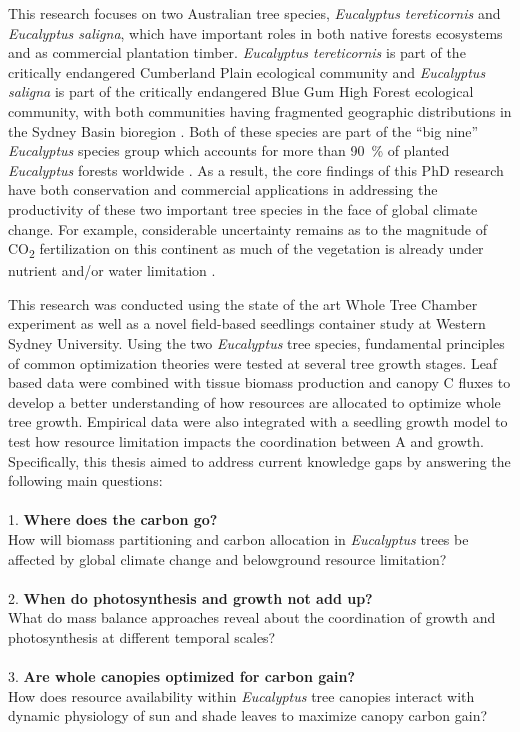 \documentclass[a4paper]{article}\usepackage[]{graphicx}\usepackage[]{color}
\begin{document}
This research focuses on two Australian tree species, \textit{Eucalyptus tereticornis} and \textit{Eucalyptus saligna}, which have important roles in both native forests ecosystems and as commercial plantation timber. \textit{Eucalyptus tereticornis} is part of the critically endangered Cumberland Plain ecological community and \textit{Eucalyptus saligna} is part of the critically endangered Blue Gum High Forest ecological community, with both communities having fragmented geographic distributions in the Sydney Basin bioregion \citep{hughes2011web}. Both of these species are part of the “big nine” \textit{Eucalyptus} species group which accounts for more than 90~\% of planted \textit{Eucalyptus} forests worldwide \citep{stanturf2013eucalyptus}. As a result, the core findings of this PhD research have both conservation and commercial applications in addressing the productivity of these two important tree species in the face of global climate change. For example, considerable uncertainty remains as to the magnitude of CO\textsubscript{2} fertilization on this continent as much of the vegetation is already under nutrient and/or water limitation \citep{hughes2003climate}. 

This research was conducted using the state of the art Whole Tree Chamber experiment as well as a novel field-based seedlings container study at Western Sydney University. Using the two \textit{Eucalyptus} tree species, fundamental principles of common optimization theories were tested at several tree growth stages. Leaf based data were combined with tissue biomass production and canopy C fluxes to develop a better understanding of how resources are allocated to optimize whole tree growth. Empirical data were also integrated with a seedling growth model to test how resource limitation impacts the coordination between A and growth. Specifically, this thesis aimed to address current knowledge gaps by answering the following main questions:
\\
\\
1.  \textbf{Where does the carbon go?} 
\\
How will biomass partitioning and carbon allocation in \textit{Eucalyptus} trees be affected by global climate change and belowground resource limitation?
\\
\\
2.  \textbf{When do photosynthesis and growth not add up?}
\\
What do mass balance approaches reveal about the coordination of growth and photosynthesis at different temporal scales?
\\
\\
3.  \textbf{Are whole canopies optimized for carbon gain?}
\\
How does resource availability within \textit{Eucalyptus} tree canopies interact with dynamic physiology of sun and shade leaves to maximize canopy carbon gain?
\end{document}
